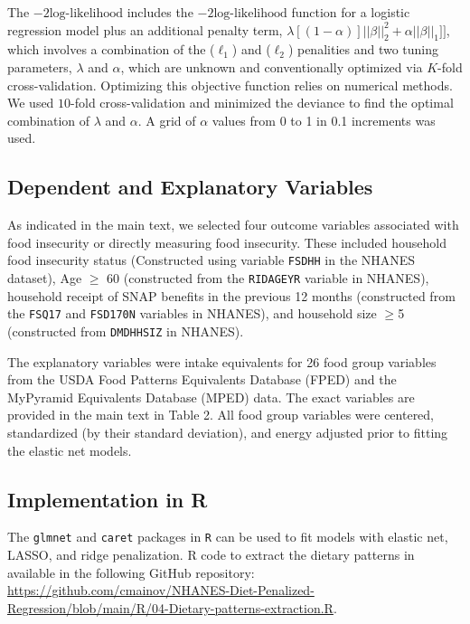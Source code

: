 \documentclass{article}
\begin{document}
The $-2\text{log-likelihood}$ includes the $-2\text{log-likelihood}$ function for a logistic regression model plus an additional penalty term, $\lambda[(1-\alpha)]||\beta||_2^2+\alpha||\beta||_1]]$, which involves a combination of the ($\ell_1$) and ($\ell_2$) penalities and two tuning parameters, $\lambda$ and $\alpha$, which are unknown and conventionally optimized via $K$-fold cross-validation. Optimizing this objective function relies on numerical methods. \supercite{jin2009elastic} We used $10$-fold cross-validation and minimized the deviance to find the optimal combination of $\lambda$ and $\alpha$. A grid of $\alpha$ values from 0 to 1 in 0.1 increments was used. 

\subsection{Dependent and Explanatory Variables}
 \hspace{\parindent} As indicated in the main text, we selected four outcome variables associated with food insecurity or directly measuring food insecurity. These included household food insecurity status (Constructed using variable \texttt{FSDHH} in the NHANES dataset), Age $\ge$ 60 (constructed from the \texttt{RIDAGEYR} variable in NHANES), household receipt of SNAP benefits in the previous 12 months (constructed from the \texttt{FSQ17} and \texttt{FSD170N} variables in NHANES), and household size $\ge$5 (constructed from \texttt{DMDHHSIZ} in NHANES).
 
  \hspace{\parindent} The explanatory variables were intake equivalents for 26 food group variables from the USDA Food Patterns Equivalents Database (FPED) and the MyPyramid Equivalents Database (MPED) data. The exact variables are provided in the main text in Table 2. All food group variables were centered, standardized (by their standard deviation), and energy adjusted prior to fitting the elastic net models.
 
\subsection{Implementation in R}
 \hspace{\parindent} The \texttt{glmnet} and \texttt{caret} packages in \texttt{R} can be used to fit models with elastic net, LASSO, and ridge penalization. R code to extract the dietary patterns in available in the following GitHub repository: \textcolor{blue}{\url{https://github.com/cmainov/NHANES-Diet-Penalized-Regression/blob/main/R/04-Dietary-patterns-extraction.R}}.
\end{document}
